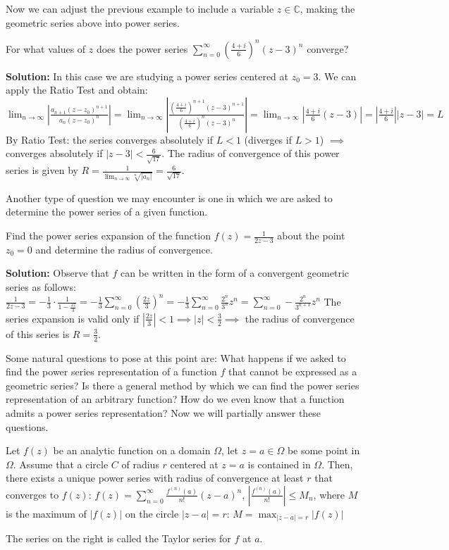 \documentclass[12pt]{article}
\begin{document}
Now we can adjust the previous example to include a variable $z \in \mathbb{C}$, making the geometric series above into power series.

\begin{example}
For what values of $z$ does the power series $\sum_{n=0}^\infty (\frac{4+i}{6})^n(z-3)^n$ converge?

\textbf{Solution:} In this case we are studying a power series centered at $z_0 = 3$. We can apply the Ratio Test and obtain:
$\lim_{n\to\infty} |\frac{a_{n+1}(z-z_0)^{n+1}}{a_n(z-z_0)^n}| = \lim_{n\to\infty} |\frac{(\frac{4+i}{6})^{n+1}(z-3)^{n+1}}{(\frac{4+i}{6})^n(z-3)^n}| = \lim_{n\to\infty} |\frac{4+i}{6}(z-3)| = |\frac{4+i}{6}||z-3| = L$
By Ratio Test: the series converges absolutely if $L < 1$ (diverges if $L > 1$) $\implies$ converges absolutely if $|z-3| < \frac{6}{\sqrt{17}}$.
The radius of convergence of this power series is given by $R = \frac{1}{\lim_{n\to\infty} \sqrt[n]{|a_n|}} = \frac{6}{\sqrt{17}}$.
\end{example}

Another type of question we may encounter is one in which we are asked to determine the power series of a given function.

\begin{example}
Find the power series expansion of the function $f(z) = \frac{1}{2z-3}$ about the point $z_0 = 0$ and determine the radius of convergence.

\textbf{Solution:} Observe that $f$ can be written in the form of a convergent geometric series as follows:
$\frac{1}{2z-3} = -\frac{1}{3} \cdot \frac{1}{1-\frac{2z}{3}} = -\frac{1}{3} \sum_{n=0}^\infty (\frac{2z}{3})^n = -\frac{1}{3} \sum_{n=0}^\infty \frac{2^n}{3^n}z^n = \sum_{n=0}^\infty -\frac{2^n}{3^{n+1}}z^n$
The series expansion is valid only if $|\frac{2z}{3}| < 1 \implies |z| < \frac{3}{2} \implies$ the radius of convergence of this series is $R = \frac{3}{2}$.
\end{example}

Some natural questions to pose at this point are: What happens if we asked to find the power series representation of a function $f$ that cannot be expressed as a geometric series? Is there a general method by which we can find the power series representation of an arbitrary function? How do we even know that a function admits a power series representation? Now we will partially answer these questions.

\begin{theorem}
Let $f(z)$ be an analytic function on a domain $\Omega$, let $z=a \in \Omega$ be some point in $\Omega$. Assume that a circle $C$ of radius $r$ centered at $z=a$ is contained in $\Omega$.
Then, there exists a unique power series with radius of convergence at least $r$ that converges to $f(z)$:
$f(z) = \sum_{n=0}^\infty \frac{f^{(n)}(a)}{n!}(z-a)^n$, $|\frac{f^{(n)}(a)}{n!}| \leq M_n$, where $M$ is the maximum of $|f(z)|$ on the circle $|z-a| = r$:
$M = \max_{|z-a|=r} |f(z)|$
\end{theorem}
The series on the right is called the Taylor series for $f$ at $a$.
\end{document}
